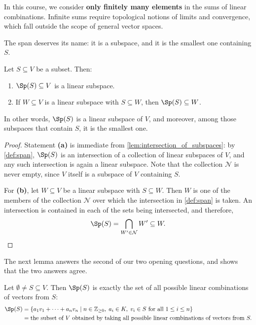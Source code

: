 \begin{importantremark}
\label{rem:finite_sums_only}
In this course, we consider \textbf{only finitely many elements} in the sums of linear combinations. Infinite sums require topological notions of limits and convergence, which fall outside the scope of general vector spaces.
\end{importantremark}

The span deserves its name: it is a subspace, and it is the smallest one containing $S$.

\begin{lemma}
\label{lem:span_is_smallest}
Let $S \subseteq V$ be a subset. Then:
\begin{enumerate}[label=\textbf{(\alph*)}]
    \item $\Sp(S) \subseteq V$ is a linear subspace.
    \item If $W \subseteq V$ is a linear subspace with $S \subseteq W$, then $\Sp(S) \subseteq W$.
\end{enumerate}
In other words, $\Sp(S)$ is a linear subspace of $V$, and moreover, among those subspaces that contain $S$, it is the smallest one.
\end{lemma}

\begin{proof}
Statement \textbf{(a)} is immediate from \cref{lem:intersection_of_subspaces}: by \cref{def:span}, $\Sp(S)$ is an intersection of a collection of linear subspaces of $V$, and any such intersection is again a linear subspace. Note that the collection $\mathcal{N}$ is never empty, since $V$ itself is a subspace of $V$ containing $S$.

For \textbf{(b)}, let $W \subseteq V$ be a linear subspace with $S \subseteq W$. Then $W$ is one of the members of the collection $\mathcal{N}$ over which the intersection in \cref{def:span} is taken. An intersection is contained in each of the sets being intersected, and therefore,
\[
\Sp(S) = \bigcap_{W' \in \mathcal{N}} W' \subseteq W. \qedhere
\]
\end{proof}

The next lemma answers the second of our two opening questions, and shows that the two answers agree.

\begin{lemma}
\label{lem:span_is_linear_combinations}
Let $\emptyset \ne S \subseteq V$. Then $\Sp(S)$ is exactly the set of all possible linear combinations of vectors from $S$:
\begin{align*}
\Sp(S) &= \{a_1 v_1 + \dots + a_n v_n \mid n \in \mathbb{Z}_{\ge 0}, \; a_i \in K, \; v_i \in S \text{ for all } 1 \le i \le n\} \\
&= \text{the subset of } V \text{ obtained by taking all possible linear combinations of vectors from } S.
\end{align*}
\end{lemma}

